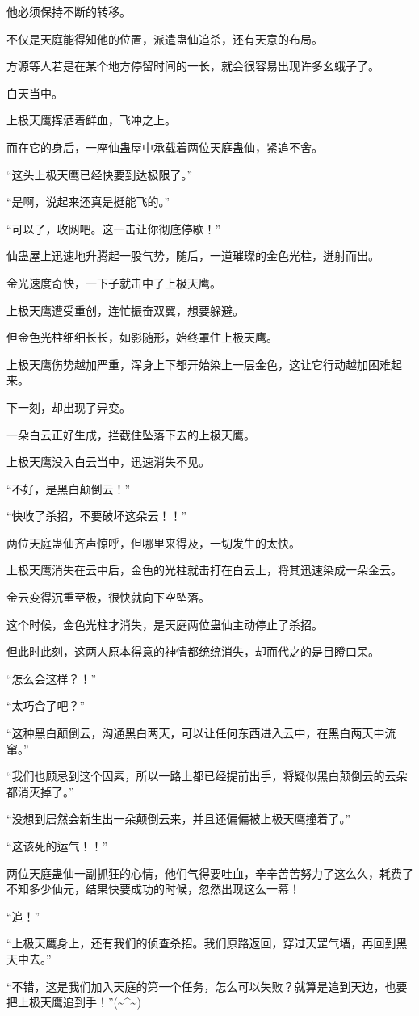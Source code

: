 \begin{this_body}
他必须保持不断的转移。

不仅是天庭能得知他的位置，派遣蛊仙追杀，还有天意的布局。

方源等人若是在某个地方停留时间的一长，就会很容易出现许多幺蛾子了。

白天当中。

上极天鹰挥洒着鲜血，飞冲之上。

而在它的身后，一座仙蛊屋中承载着两位天庭蛊仙，紧追不舍。

“这头上极天鹰已经快要到达极限了。”

“是啊，说起来还真是挺能飞的。”

“可以了，收网吧。这一击让你彻底停歇！”

仙蛊屋上迅速地升腾起一股气势，随后，一道璀璨的金色光柱，迸射而出。

金光速度奇快，一下子就击中了上极天鹰。

上极天鹰遭受重创，连忙振奋双翼，想要躲避。

但金色光柱细细长长，如影随形，始终罩住上极天鹰。

上极天鹰伤势越加严重，浑身上下都开始染上一层金色，这让它行动越加困难起来。

下一刻，却出现了异变。

一朵白云正好生成，拦截住坠落下去的上极天鹰。

上极天鹰没入白云当中，迅速消失不见。

“不好，是黑白颠倒云！”

“快收了杀招，不要破坏这朵云！！”

两位天庭蛊仙齐声惊呼，但哪里来得及，一切发生的太快。

上极天鹰消失在云中后，金色的光柱就击打在白云上，将其迅速染成一朵金云。

金云变得沉重至极，很快就向下空坠落。

这个时候，金色光柱才消失，是天庭两位蛊仙主动停止了杀招。

但此时此刻，这两人原本得意的神情都统统消失，却而代之的是目瞪口呆。

“怎么会这样？！”

“太巧合了吧？”

“这种黑白颠倒云，沟通黑白两天，可以让任何东西进入云中，在黑白两天中流窜。”

“我们也顾忌到这个因素，所以一路上都已经提前出手，将疑似黑白颠倒云的云朵都消灭掉了。”

“没想到居然会新生出一朵颠倒云来，并且还偏偏被上极天鹰撞着了。”

“这该死的运气！！”

两位天庭蛊仙一副抓狂的心情，他们气得要吐血，辛辛苦苦努力了这么久，耗费了不知多少仙元，结果快要成功的时候，忽然出现这么一幕！

“追！”

“上极天鹰身上，还有我们的侦查杀招。我们原路返回，穿过天罡气墙，再回到黑天中去。”

“不错，这是我们加入天庭的第一个任务，怎么可以失败？就算是追到天边，也要把上极天鹰追到手！”(\~{}\^{}\~{})

\end{this_body}

